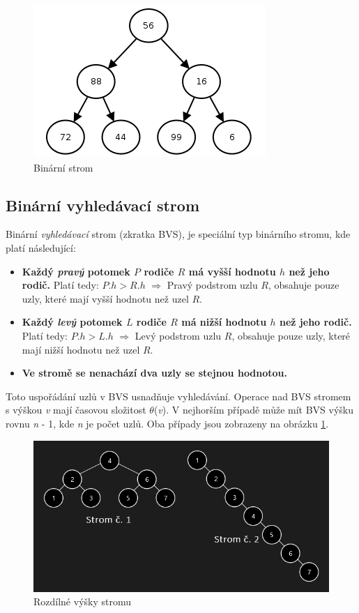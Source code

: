 \documentclass[
  biblatex=false,
  font=serif,
  glossaries=false,
  tables=false,
  theorems=false,
  index
]{kidiplom}
\begin{document}
\begin{figure}[h!]
\centering
	\includegraphics[scale=0.9]{obrazky/3BinarniStrom.png}
	\caption{Binární strom}
\end{figure}

\medskip
\subsection{Binární vyhledávací strom}
Binární \textit{vyhledávací} strom (zkratka BVS), je speciální typ binárního stromu, kde platí následující:
\begin{itemize}
\item \textbf {Každý \textit{pravý} potomek $P$ rodiče $R$ má vyšší hodnotu $h$ než jeho rodič.} Platí tedy: $P.h > R.h$ $\Rightarrow$ Pravý podstrom uzlu $R$, obsahuje pouze uzly, které mají vyšší hodnotu než uzel $R$. 
\item \textbf {Každý \textit{levý} potomek $L$ rodiče $R$ má nižší hodnotu $h$ než jeho rodič.} Platí tedy: $P.h > L.h$ $\Rightarrow$ Levý podstrom uzlu $R$, obsahuje pouze uzly, které mají nižší hodnotu než uzel $R$. 
\item \textbf {Ve stromě se nenachází dva uzly se stejnou hodnotou.}
\end{itemize} 

\noindent Toto uspořádání uzlů v BVS usnadňuje vyhledávání. Operace nad BVS stromem s výškou \textit{v}  mají časovou složitost $ \theta$(\textit{v}). V nejhorším případě může mít BVS výšku rovnu \textit{n} - 1, kde \textit{n} je počet uzlů. Oba případy jsou zobrazeny na obrázku \ref{binary}.

\begin{figure}[h!]
\centering
	\includegraphics[scale=0.7]{obrazky/4BinarniVyhledavaciStrom.png}
	\caption{Rozdílné výšky stromu}
	\label{binary}
\end{figure}
\end{document}
